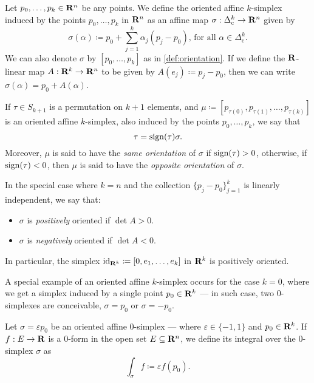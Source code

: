 \begin{definition}
    \label{def:oriented-affine-k-simplex}
    Let \(p_0, \dots, p_k \in \mathbf{R}^n\) be any points. We define the oriented affine
    \(k\)-simplex induced by the points \(p_0, \dots, p_k\) in \(\mathbf{R}^n\) as an affine
    map \(\sigma: \Delta_{\text{c}}^k \to \mathbf{R}^n\) given by
    \[
        \sigma(\alpha) \coloneq p_0 + \sum_{j=1}^k \alpha_j (p_j - p_0)
        \text{, for all } \alpha \in \Delta_{\text{c}}^k.
    \]
    We can also denote \(\sigma\) by \([p_0, \dots, p_k]\) as in
    \cref{def:orientation}. If we define the \(\mathbf{R}\)-linear map \(A: \mathbf{R}^k \to \mathbf{R}^n\)
    to be given by \(A(e_j) \coloneq p_j - p_0\), then we can write \(\sigma(\alpha)
    = p_0 + A(\alpha)\).

    If \(\tau \in S_{k+1}\) is a permutation on \(k+1\) elements, and \(\mu \coloneq
    [p_{\tau(0)}, p_{\tau(1)}, \dots, p_{\tau(k)}]\) is an oriented affine
    \(k\)-simplex, also induced by the points \(p_0, \dots, p_k\), we say that
    \[
        \tau = \operatorname{sign}(\tau) \sigma.
    \]
    Moreover, \(\mu\) is said to have the \emph{same orientation} of \(\sigma\) if
    \(\operatorname{sign}(\tau) > 0\), otherwise, if \(\operatorname{sign}(\tau) < 0\), then \(\mu\) is said to
    have the \emph{opposite orientation} of \(\sigma\).

    In the special case where \(k = n\) and the collection \(\{p_{j} -
    p_0\}_{j=1}^k\) is linearly independent, we say that:
    \begin{itemize}\setlength\itemsep{0em}
        \item \(\sigma\) is \emph{positively} oriented if \(\det A > 0\).
        \item \(\sigma\) is \emph{negatively} oriented if \(\det A < 0\).
    \end{itemize}
    In particular, the simplex \(\operatorname{id}_{\mathbf{R}^k} \coloneq [0, e_1, \dots, e_k]\) in
    \(\mathbf{R}^k\) is positively oriented.
\end{definition}

\begin{example}
    \label{exp:oriented-0-simplex}
    A special example of an oriented affine \(k\)-simplex occurs for the case \(k =
    0\), where we get a simplex induced by a single point \(p_0 \in \mathbf{R}^k\) --- in
    such case, two \(0\)-simplexes are conceivable, \(\sigma = p_0\) or \(\sigma =
    -p_0\).
\end{example}

\begin{definition}
    \label{def:oriented-0-simplex-integral-0-form}
    Let \(\sigma = \varepsilon p_0\) be an oriented affine \(0\)-simplex --- where
    \(\varepsilon \in \{-1, 1\}\) and \(p_0 \in \mathbf{R}^k\). If \(f: E \to \mathbf{R}\) is a
    \(0\)-form in the open set \(E \subseteq \mathbf{R}^n\), we define its integral over the
    \(0\)-simplex \(\sigma\) as
    \[
        \int_{\sigma} f \coloneq \varepsilon f(p_0).
    \]
\end{definition}

